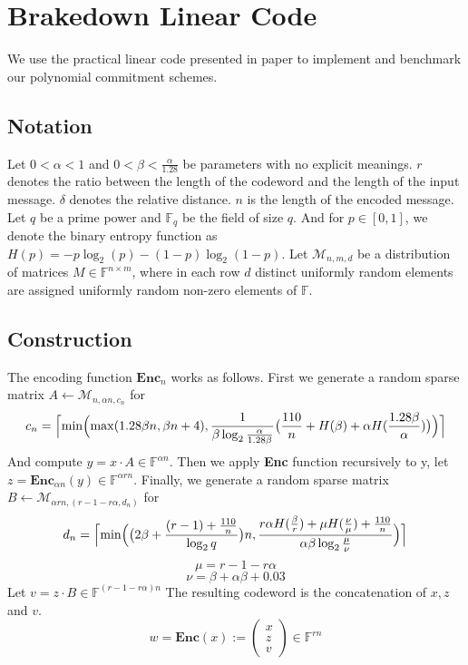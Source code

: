 \chapter{Brakedown Linear Code}

We use the practical linear code presented in paper \cite{brakedown} to implement and benchmark our polynomial commitment schemes.

\section{Notation}

Let $0 < \alpha < 1$ and $0 < \beta < \frac{\alpha}{1.28}$ be parameters with no explicit meanings. $r$ denotes the ratio between the length of the codeword and the length of the input message. $\delta$ denotes the relative distance. $n$ is the length of the encoded message. Let $q$ be a prime power and $\mathbb{F}_q$ be the field of size $q$. And for $p \in [0, 1]$, we denote the binary entropy function as $H(p) = -p\log_2(p) - (1 - p)\log_2(1-p)$. Let $\mathcal{M}_{n, m, d}$ be a distribution of matrices $M \in \mathbb{F}^{n \times m}$, where in each row $d$ distinct uniformly random elements are assigned uniformly random non-zero elements of $\mathbb{F}$.

\section{Construction}

The encoding function $\textbf{Enc}_n$ works as follows. First we generate a random sparse matrix $A \leftarrow \mathcal{M}_{n, \alpha n, c_n}$ for 
$$
    c_n = \Bigl \lceil \min \Bigl( \max (1.28 \beta n, \beta n + 4), \frac{1}{\beta \log_2 \frac{\alpha}{1.28 \beta}} \bigl( \frac{110}{n} + H(\beta) + \alpha H (\frac{1.28 \beta}{\alpha}) \bigr) \Bigr) \Bigr \rceil
$$
And compute $y = x \cdot A \in \mathbb{F}^{\alpha n}$. Then we apply \textbf{Enc} function recursively to y, let $z = \textbf{Enc}_{\alpha n}(y) \in \mathbb{F}^{\alpha r n}$. Finally, we generate a random sparse matrix $B \leftarrow \mathcal{M}_{\alpha r n, (r - 1 - r \alpha, d_n)}$ for
$$
    d_n = \Bigl \lceil \min \Bigl( \bigl( 2\beta + \frac{(r-1) + \frac{110}{n}}{\log_2 q} \bigr)n, \frac{r \alpha H(\frac{\beta}{r}) + \mu H(\frac{\nu}{\mu}) + \frac{110}{n}}{\alpha \beta \log_2 \frac{\mu}{\nu}} \Bigr) \Bigr \rceil
$$
$$
    \mu = r - 1 - r \alpha
$$
$$
    \nu = \beta + \alpha \beta + 0.03
$$
Let $v = z \cdot B \in \mathbb{F}^{(r - 1 - r\alpha)n}$ The resulting codeword is the concatenation of $x, z$ and $v$.
$$
    w = \textbf{Enc}(x) := \left( \begin{array}{c} x \\ z \\ v \end{array} \right) 
    \in \mathbb{F}^{rn}
$$

